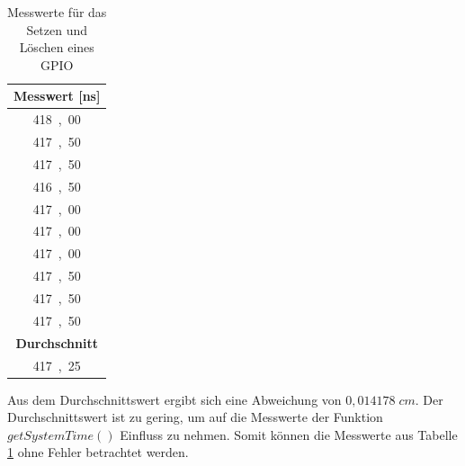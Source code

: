 \begin{table}[H]
\centering
\caption{Messwerte für das Setzen und Löschen eines GPIO}
\label{table:modul_E2}
\begin{tabular}{|c|}
\hline
\textbf{Messwert [\si{ns}]} \\ \hline
\si{418,00}	 \\ \hline
\si{417,50}	 \\ \hline
\si{417,50}	 \\ \hline
\si{416,50}	 \\ \hline
\si{417,00}	 \\ \hline
\si{417,00}	 \\ \hline
\si{417,00}	 \\ \hline
\si{417,50}	 \\ \hline
\si{417,50}	 \\ \hline
\si{417,50}	 \\ \hline
\textbf{Durchschnitt}      \\ \hline
\si{417,25}	 \\ \hline
\end{tabular}
\end{table}

Aus dem Durchschnittswert ergibt sich eine Abweichung von $0,014178 \; cm$. Der Durchschnittswert ist zu gering, um auf die Messwerte der Funktion $getSystemTime()$ Einfluss zu nehmen. Somit können die Messwerte aus Tabelle \ref{table:modul_E2} ohne Fehler betrachtet werden.


